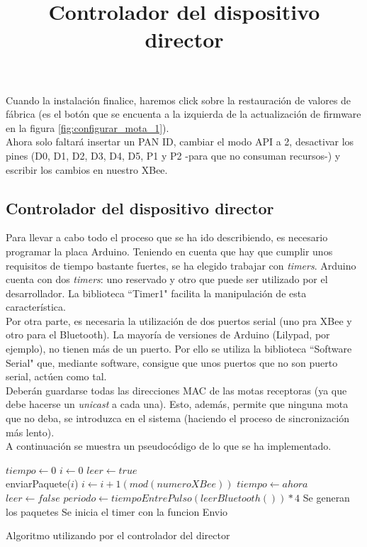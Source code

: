 Cuando la instalación finalice, haremos click sobre la restauración de valores de fábrica
(es el botón que se encuenta a la izquierda de la actualización de firmware en la figura \ref{fig:configurar_mota_1}).\\

Ahora solo faltará insertar un PAN ID, cambiar el modo API a 2, desactivar los pines (D0, D1, D2, D3, D4, D5, P1 y P2
-para que no consuman recursos-) y escribir los cambios en nuestro XBee.\\


\subsection{Controlador del dispositivo director}
\title{Controlador del dispositivo director}

Para llevar a cabo todo el proceso que se ha ido describiendo, es necesario programar
la placa Arduino. Teniendo en cuenta que hay que cumplir unos requisitos de tiempo bastante
fuertes, se ha elegido trabajar con \textit{timers}. Arduino cuenta con dos \textit{timers}: uno reservado
y otro que puede ser utilizado por el desarrollador.
La biblioteca ``Timer1" \cite{timeronearduino} facilita la manipulación de esta característica.\\

Por otra parte, es necesaria la utilización de dos puertos serial (uno pra XBee y otro para el Bluetooth).
La mayoría de versiones de Arduino (Lilypad, por ejemplo), no tienen más de un puerto.
Por ello se utiliza la biblioteca ``Software Serial" \cite{softwareserial} que, mediante software, consigue
que unos puertos que no son puerto serial, actúen como tal.\\

Deberán guardarse todas las direcciones MAC de las motas receptoras (ya que debe hacerse un
\textit{unicast} a cada una). Esto, además, permite que ninguna
mota que no deba, se introduzca en el sistema (haciendo el proceso de sincronización más lento).\\

A continuación se muestra un pseudocódigo de lo que se ha implementado.
\begin{algorithm}
  \begin{algorithmic}[1]
     \State $tiempo\gets 0$
     \State $i\gets 0$
     \State $leer \gets true$\\

        \State enviarPaquete($i$)
        \State $i \gets i+1(mod(numeroXBee))$
        \State $tiempo \gets ahora$
      \EndIf
      \EndFunction\\

        \State $leer \gets false$
        \State $periodo\gets tiempoEntrePulso(leerBluetooth())*4$
        \State Se generan los paquetes
        \State Se inicia el timer con la funcion Envio
      \EndIf
     \EndIf
    \EndWhile
  \end{algorithmic}
  \caption{Algoritmo utilizando por el controlador del director}
\end{algorithm}

